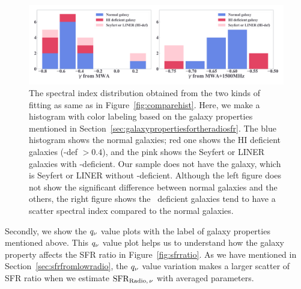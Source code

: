 \begin{figure}[htbp]
	\centering
	\includegraphics[width=\linewidth]{Chapter_6/Figures/Discuss_comparehist.pdf}
    \caption[Histograms of $\gamma$ from the fitting (labeled)]{\label{fig:comparehist_h1def}
        The spectral index distribution obtained from the two kinds of fitting as same as in Figure~\ref{fig:comparehist}.
        Here, we make a histogram with color labeling based on the galaxy properties mentioned in Section~\ref{sec:galaxypropertiesfortheradiosfr}.
        The blue histogram shows the normal galaxies; red one shows the HI deficient galaxies (\nh-def $> 0.4$), and the pink shows the Seyfert or LINER galaxies with \nh-deficient.
        Our sample does not have the galaxy, which is Seyfert or LINER without \nh-deficient.
        Although the left figure does not show the significant difference between normal galaxies and the others, the right figure shows the \nh~deficient galaxies tend to have a scatter spectral index compared to the normal galaxies.
    }
\end{figure}


Secondly, we show the $q_{\nu}$ value plots with the label of galaxy properties mentioned above.
This $q_{\nu}$ value plot helps us to understand how the galaxy property affects the SFR ratio in Figure~\ref{fig:sfrratio}.
As we have mentioned in Section~\ref{sec:sfrfromlowradio}, the $q_{\nu}$ value variation makes a larger scatter of SFR ratio when we estimate $\mathrm{SFR}_{\mathrm{Radio},\,\nu}$ with averaged parameters.

